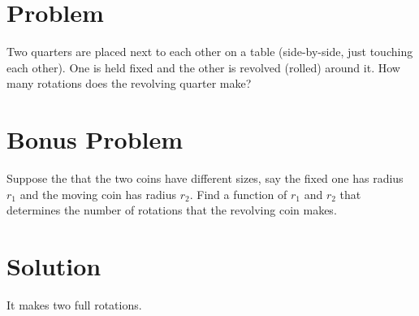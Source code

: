 \documentclass[11pt,a4paper]{report}
\theoremstyle{plain}
\theoremstyle{definition}
\theoremstyle{remark}
\begin{document}
\section*{Problem}
Two quarters are placed next to each other on a table (side-by-side, just touching each other).  One is held fixed and the other is revolved (rolled) around it.  How many rotations does the revolving quarter make?  

\section*{Bonus Problem}
 Suppose the that the two coins have different sizes, say the fixed one has radius $r_1$ and the moving coin has radius $r_2$.  Find a function of $r_1$ and $r_2$ that determines the number of rotations that the revolving coin makes.

\section*{Solution}
It makes two full rotations. 
\end{document}
